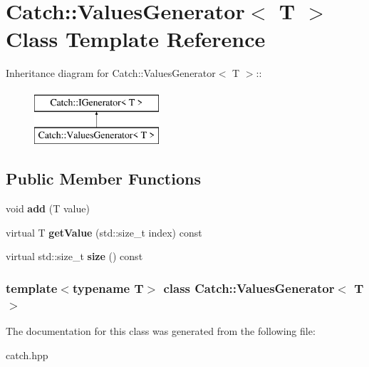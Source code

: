 \hypertarget{classCatch_1_1ValuesGenerator}{
\section{Catch::ValuesGenerator$<$ T $>$ Class Template Reference}
\label{classCatch_1_1ValuesGenerator}
}
Inheritance diagram for Catch::ValuesGenerator$<$ T $>$::\begin{figure}[H]
\begin{center}
\leavevmode
\includegraphics[height=2cm]{classCatch_1_1ValuesGenerator}
\end{center}
\end{figure}
\subsection*{Public Member Functions}
\begin{DoxyCompactItemize}
\item 
\hypertarget{classCatch_1_1ValuesGenerator_a8412c8ce5d9d4fc6ff06d5246d56d538}{
void {\bfseries add} (T value)}
\label{classCatch_1_1ValuesGenerator_a8412c8ce5d9d4fc6ff06d5246d56d538}

\item 
\hypertarget{classCatch_1_1ValuesGenerator_a60599dd67096ff108471f64ee42acd9d}{
virtual T {\bfseries getValue} (std::size\_\-t index) const }
\label{classCatch_1_1ValuesGenerator_a60599dd67096ff108471f64ee42acd9d}

\item 
\hypertarget{classCatch_1_1ValuesGenerator_a98a80bb0dd682c44e82e4a75e98c4682}{
virtual std::size\_\-t {\bfseries size} () const }
\label{classCatch_1_1ValuesGenerator_a98a80bb0dd682c44e82e4a75e98c4682}

\end{DoxyCompactItemize}
\subsubsection*{template$<$typename T$>$ class Catch::ValuesGenerator$<$ T $>$}



The documentation for this class was generated from the following file:\begin{DoxyCompactItemize}
\item 
catch.hpp\end{DoxyCompactItemize}

